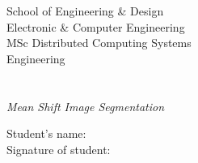 \begin{titlepage}
    \begin{center}
        \large  
		\vspace*{1cm}
		{School of Engineering \& Design}\\
		{Electronic \& Computer Engineering}\\
		\vspace{1.2cm}
		{MSc Distributed Computing Systems}\\
		{Engineering}\\
		\vspace{2cm}
		\huge
		{\myUni}\\
		\vspace{2.5cm}
		\Huge
		\begingroup
			\color{Maroon}{\myTitle}\\
			\textit{\large{Mean Shift Image Segmentation}} \\
		\endgroup	
		\vspace{4.5cm}
		\large
	\begin{flushleft}
		{Student's name: }\\
		\vspace{0.5cm}
	   	{Signature of student: }\\
	 \end{flushleft}
		
		\vfill
		
		\normalsize

    \end{center}
\end{titlepage}        
